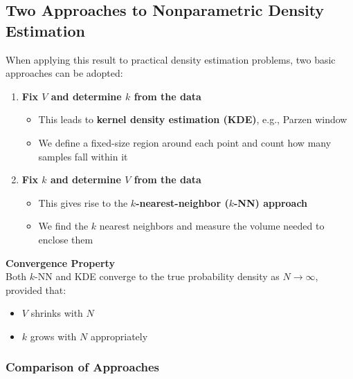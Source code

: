 \documentclass[11pt,a4paper]{article}
\theoremstyle{definition}
\theoremstyle{plain}
\theoremstyle{remark}
\begin{document}
\subsection{Two Approaches to Nonparametric Density Estimation}

When applying this result to practical density estimation problems, two basic approaches can be adopted:

\begin{enumerate}
    \item \textbf{Fix $V$ and determine $k$ from the data}
    \begin{itemize}
        \item This leads to \textbf{kernel density estimation (KDE)}, e.g., Parzen window
        \item We define a fixed-size region around each point and count how many samples fall within it
    \end{itemize}
    
    \item \textbf{Fix $k$ and determine $V$ from the data}
    \begin{itemize}
        \item This gives rise to the \textbf{$k$-nearest-neighbor ($k$-NN) approach}
        \item We find the $k$ nearest neighbors and measure the volume needed to enclose them
    \end{itemize}
\end{enumerate}

\begin{center}
\colorbox{purple!15}{\parbox{0.9\textwidth}{
\textbf{Convergence Property}\\[0.2cm]
Both $k$-NN and KDE converge to the true probability density as $N \to \infty$, provided that:
\begin{itemize}
    \item $V$ shrinks with $N$
    \item $k$ grows with $N$ appropriately
\end{itemize}
}}
\end{center}

\subsubsection{Comparison of Approaches}
\end{document}
